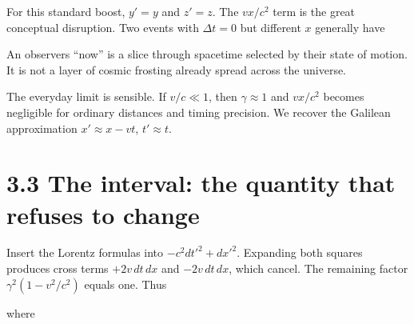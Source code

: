 \documentclass[
  11pt,
  letterpaper,
  oneside,
  openany]{scrbook}
\begin{document}
For this standard boost, \(y'=y\) and \(z'=z\). The \(vx/c^2\) term is
the great conceptual disruption. Two events with \(\Delta t=0\) but
different \(x\) generally have

\begin{center}
\begingroup
{}
\ifdim\wd\grmathbox>\linewidth
\resizebox{\linewidth}{!}{\usebox{\grmathbox}}
\else\usebox{\grmathbox}\fi
\endgroup
\end{center}

An observer\textquotesingle s ``now'' is a slice through spacetime
selected by their state of motion. It is not a layer of cosmic frosting
already spread across the universe.

The everyday limit is sensible. If \(v/c\ll1\), then \(\gamma\approx1\)
and \(vx/c^2\) becomes negligible for ordinary distances and timing
precision. We recover the Galilean approximation \(x'\approx x-vt\),
\(t'\approx t\).

\hypertarget{the-interval-the-quantity-that-refuses-to-change}{%
\section{3.3 The interval: the quantity that refuses to
change}\label{the-interval-the-quantity-that-refuses-to-change}}

Insert the Lorentz formulas into \(-c^2dt'^2+dx'^2\). Expanding both
squares produces cross terms \(+2v\,dt\,dx\) and \(-2v\,dt\,dx\), which
cancel. The remaining factor \(\gamma^2(1-v^2/c^2)\) equals one. Thus

\begin{center}
\begingroup
{}
\ifdim\wd\grmathbox>\linewidth
\resizebox{\linewidth}{!}{\usebox{\grmathbox}}
\else\usebox{\grmathbox}\fi
\endgroup
\end{center}

where

\begin{center}
\begingroup
{}
\ifdim\wd\grmathbox>\linewidth
\resizebox{\linewidth}{!}{\usebox{\grmathbox}}
\else\usebox{\grmathbox}\fi
\endgroup
\end{center}
\end{document}
